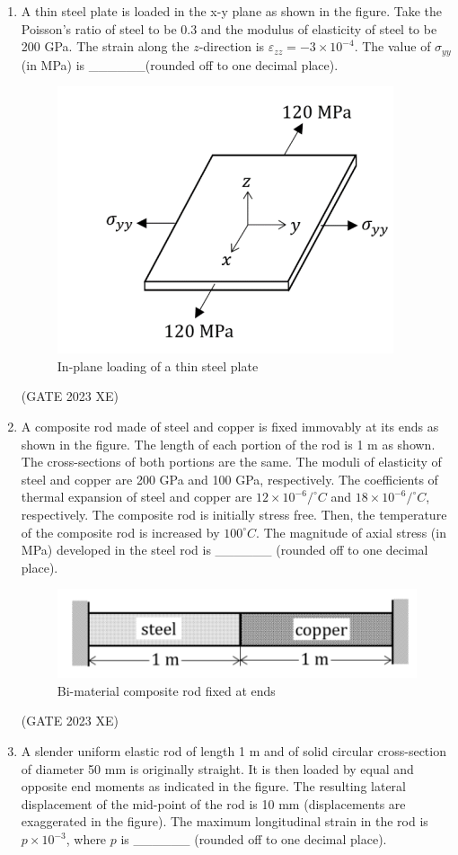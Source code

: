 \documentclass[journal,12pt,onecolumn]{IEEEtran}
\begin{document}
\begin{enumerate}
\newpage

\item A thin steel plate is loaded in the x-y plane as shown in the figure. Take the
Poisson’s ratio of steel to be 0.3 and the modulus of elasticity of steel to be 200
GPa. The strain along the $z$-direction is $\varepsilon_{zz}=-3\times 10^{-4}$. The value of
$\sigma_{yy}$ (in MPa) is \_\_\_\_\_\_(rounded off to one decimal place).

\begin{figure}[htbp]
\centering
\includegraphics[width=0.4\columnwidth]{figs/C/fig16.png}
\caption{In-plane loading of a thin steel plate}
\label{fig:figs/C/fig16.png}
\end{figure}
\hfill{(GATE 2023 XE)}

\item A composite rod made of steel and copper is fixed immovably at its ends as shown
in the figure. The length of each portion of the rod is 1 m as shown. The
cross-sections of both portions are the same. The moduli of elasticity of steel and
copper are 200 GPa and 100 GPa, respectively. The coefficients of thermal
expansion of steel and copper are $12\times 10^{-6}/^{\circ}C$ and $18\times 10^{-6}/^{\circ}C$, respectively.
The composite rod is initially stress free. Then, the temperature of the composite
rod is increased by $100^{\circ}C$. The magnitude of axial stress (in MPa) developed in
the steel rod is \_\_\_\_\_\_ (rounded off to one decimal place).

\begin{figure}[htbp]
\centering
\includegraphics[width=0.4\columnwidth]{figs/C/fig17.png}
\caption{Bi-material composite rod fixed at ends}
\label{fig:figs/C/fig17.png}
\end{figure}
\hfill{(GATE 2023 XE)}\\

\item A slender uniform elastic rod of length 1 m and of solid circular cross-section of
diameter 50 mm is originally straight. It is then loaded by equal and opposite end
moments as indicated in the figure. The resulting lateral displacement of the
mid-point of the rod is 10 mm (displacements are exaggerated in the figure). The
maximum longitudinal strain in the rod is $p\times 10^{-3}$, where $p$ is \_\_\_\_\_\_ (rounded off to one decimal place).


\end{enumerate}
\end{document}
